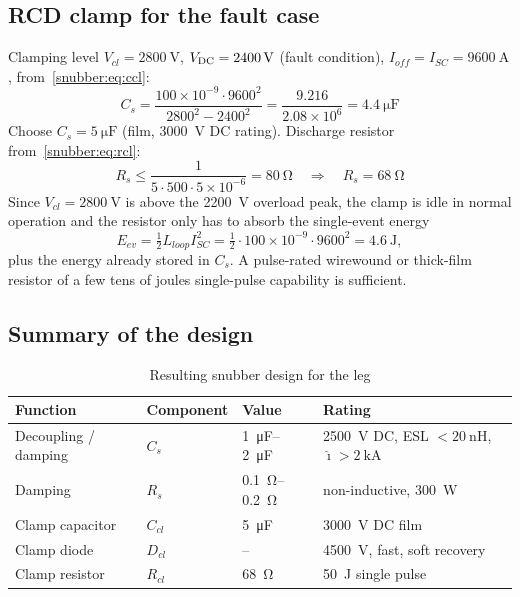 \subsection{RCD clamp for the fault case}

Clamping level $V_{cl}=\SI{2800}{\volt}$, $V_{\mathrm{DC}} = \SI{2400}{\volt}$ (fault
condition), $I_{off}=I_{SC}=\SI{9600}{\ampere}$, from~\eqref{snubber:eq:ccl}:
\begin{equation}
C_s = \frac{100\times10^{-9}\cdot 9600^{2}}{2800^{2}-2400^{2}}
    = \frac{9.216}{2.08\times10^{6}}
    = \SI{4.4}{\micro\farad}
\end{equation}
Choose $C_s = \SI{5}{\micro\farad}$ (film, \SI{3000}{\volt} DC rating).
Discharge resistor from~\eqref{snubber:eq:rcl}:
\begin{equation}
R_s \le \frac{1}{5\cdot 500\cdot 5\times10^{-6}} = \SI{80}{\ohm}
\quad\Rightarrow\quad R_s = \SI{68}{\ohm}
\end{equation}
Since $V_{cl}=\SI{2800}{\volt}$ is above the \SI{2200}{\volt} overload peak,
the clamp is idle in normal operation and the resistor only has to absorb the
single-event energy
\begin{equation}
E_{ev} = \tfrac{1}{2} L_{loop} I_{SC}^{2}
= \tfrac{1}{2}\cdot 100\times10^{-9}\cdot 9600^{2} = \SI{4.6}{\joule},
\end{equation}
plus the energy already stored in $C_s$. A pulse-rated wirewound or thick-film
resistor of a few tens of joules single-pulse capability is sufficient.

\subsection{Summary of the design}

\begin{table}[htbp]
\centering
\caption{Resulting snubber design for the leg}
\label{snubber:tab:result}
\begin{tabular}{llll}
\toprule
Function & Component & Value & Rating \\
\midrule
Decoupling / damping & $C_s$ & \SIrange{1}{2}{\micro\farad} & \SI{2500}{\volt} DC, ESL $<\SI{20}{\nano\henry}$, $\hat\imath > \SI{2}{\kilo\ampere}$ \\
Damping              & $R_s$ & \SIrange{0.1}{0.2}{\ohm}     & non-inductive, \SI{300}{\watt} \\
Clamp capacitor      & $C_{cl}$ & \SI{5}{\micro\farad}      & \SI{3000}{\volt} DC film \\
Clamp diode          & $D_{cl}$ & --                        & \SI{4500}{\volt}, fast, soft recovery \\
Clamp resistor       & $R_{cl}$ & \SI{68}{\ohm}             & \SI{50}{\joule} single pulse \\
\bottomrule
\end{tabular}
\end{table}

